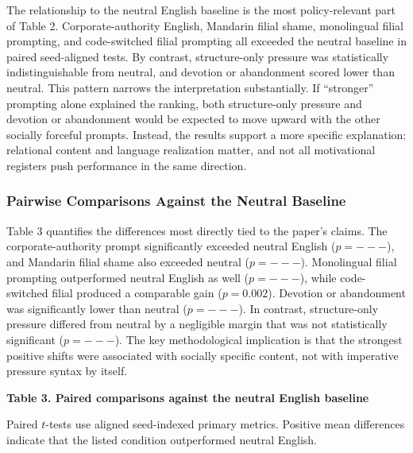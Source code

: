 \documentclass{article}
\begin{document}
The relationship to the neutral English baseline is the most policy-relevant part of Table 2. Corporate-authority English, Mandarin filial shame, monolingual filial prompting, and code-switched filial prompting all exceeded the neutral baseline in paired seed-aligned tests. By contrast, structure-only pressure was statistically indistinguishable from neutral, and devotion or abandonment scored lower than neutral. This pattern narrows the interpretation substantially. If ``stronger'' prompting alone explained the ranking, both structure-only pressure and devotion or abandonment would be expected to move upward with the other socially forceful prompts. Instead, the results support a more specific explanation: relational content and language realization matter, and not all motivational registers push performance in the same direction.

\subsubsection{Pairwise Comparisons Against the Neutral Baseline}

\label{sec:pairwise_comparisons_against_the_neutral}

Table 3 quantifies the differences most directly tied to the paper's claims. The corporate-authority prompt significantly exceeded neutral English (\(p=---\)), and Mandarin filial shame also exceeded neutral (\(p=---\)). Monolingual filial prompting outperformed neutral English as well (\(p=---\)), while code-switched filial produced a comparable gain (\(p=0.002\)). Devotion or abandonment was significantly lower than neutral (\(p=---\)). In contrast, structure-only pressure differed from neutral by a negligible margin that was not statistically significant (\(p=---\)). The key methodological implication is that the strongest positive shifts were associated with socially specific content, not with imperative pressure syntax by itself.

\textbf{Table 3. Paired comparisons against the neutral English baseline}

Paired \(t\)-tests use aligned seed-indexed primary metrics. Positive mean differences indicate that the listed condition outperformed neutral English.
\end{document}
